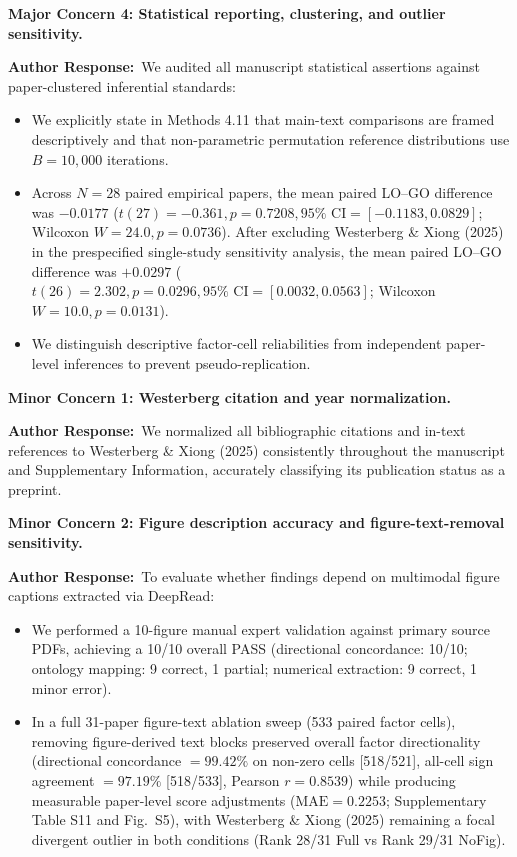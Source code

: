 \documentclass[11pt]{article}
\newcommand{\reviewercomment}[1]{\vspace{1em}\noindent\textbf{\color{blue!80!black}#1}\vspace{0.4em}}
\newcommand{\authorsresponse}{\noindent\textbf{\color{black}Author Response:}\ }
\begin{document}
\reviewercomment{Major Concern 4: Statistical reporting, clustering, and outlier sensitivity.}

\authorsresponse We audited all manuscript statistical assertions against paper-clustered inferential standards:
\begin{itemize}[leftmargin=*,noitemsep]
\item We explicitly state in Methods 4.11 that main-text comparisons are framed descriptively and that non-parametric permutation reference distributions use $B = 10{,}000$ iterations.
\item Across $N=28$ paired empirical papers, the mean paired LO--GO difference was $-0.0177$ ($t(27)=-0.361, p=0.7208, 95\%\text{ CI}=[-0.1183, 0.0829]$; Wilcoxon $W=24.0, p=0.0736$). After excluding Westerberg \& Xiong (2025) in the prespecified single-study sensitivity analysis, the mean paired LO--GO difference was $+0.0297$ ($t(26)=2.302, p=0.0296, 95\%\text{ CI}=[0.0032, 0.0563]$; Wilcoxon $W=10.0, p=0.0131$).
\item We distinguish descriptive factor-cell reliabilities from independent paper-level inferences to prevent pseudo-replication.
\end{itemize}

\reviewercomment{Minor Concern 1: Westerberg citation and year normalization.}

\authorsresponse We normalized all bibliographic citations and in-text references to Westerberg \& Xiong (2025) consistently throughout the manuscript and Supplementary Information, accurately classifying its publication status as a preprint.

\reviewercomment{Minor Concern 2: Figure description accuracy and figure-text-removal sensitivity.}

\authorsresponse To evaluate whether findings depend on multimodal figure captions extracted via DeepRead:
\begin{itemize}[leftmargin=*,noitemsep]
\item We performed a 10-figure manual expert validation against primary source PDFs, achieving a 10/10 overall PASS (directional concordance: 10/10; ontology mapping: 9 correct, 1 partial; numerical extraction: 9 correct, 1 minor error).
\item In a full 31-paper figure-text ablation sweep (533 paired factor cells), removing figure-derived text blocks preserved overall factor directionality (directional concordance $= 99.42\%$ on non-zero cells [518/521], all-cell sign agreement $= 97.19\%$ [518/533], Pearson $r = 0.8539$) while producing measurable paper-level score adjustments ($\text{MAE} = 0.2253$; Supplementary Table S11 and Fig.~S5), with Westerberg \& Xiong (2025) remaining a focal divergent outlier in both conditions (Rank 28/31 Full vs Rank 29/31 NoFig).
\end{itemize}
\end{document}
